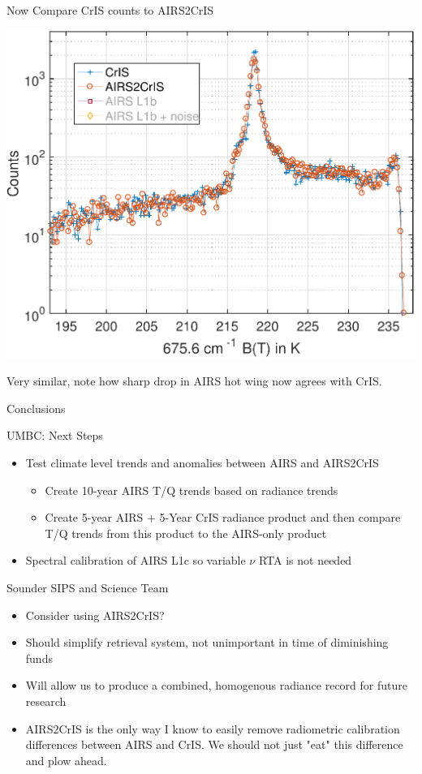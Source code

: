 \documentclass[10pt,t]{beamer}
\begin{document}
\begin{frame}[label={sec:orgc445909}]{Now Compare CrIS counts to AIRS2CrIS}
\begin{center}
\includegraphics[width=0.7\linewidth]{./Figs/Pdf/jun4_2015_airs_675wn_global_counts_w_airsnoise_and_cris_a2c_no_airs.pdf}
\end{center}
\vspace{-0.05in}
\small
Very similar, note how sharp drop in AIRS hot wing now agrees with CrIS.
\end{frame}

\begin{frame}[label={sec:orgb04bdc0}]{Conclusions}
\vspace{-0.10in}
\small
\begin{block}{UMBC: Next Steps}
\begin{itemize}
\item Test climate level trends and anomalies between AIRS and AIRS2CrIS
\begin{itemize}
\item Create 10-year AIRS T/Q trends based on radiance trends
\item Create 5-year AIRS + 5-Year CrIS radiance product and then compare T/Q trends from this product to the AIRS-only product
\end{itemize}
\item Spectral calibration of AIRS L1c so variable \(\nu\) RTA is not needed
\end{itemize}
\end{block}

\begin{block}{Sounder SIPS and Science Team}
\begin{itemize}
\item Consider using AIRS2CrIS?
\item Should simplify retrieval system, not unimportant in time of diminishing funds
\item Will allow us to produce a combined, homogenous radiance record for future research
\item AIRS2CrIS is the only way I know to easily remove radiometric calibration differences between AIRS and CrIS.  We should not just "eat" this difference and plow ahead.
\end{itemize}
\end{block}
\end{frame}
\end{document}

